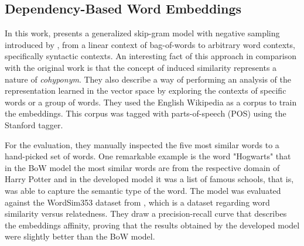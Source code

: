 \subsection{Dependency-Based Word Embeddings}

In this work,  presents a generalized skip-gram model with negative sampling introduced by , from a linear context of bag-of-words to arbitrary word contexts, specifically syntactic contexts. An interesting fact of this approach in comparison with the original work is that the concept of induced similarity represents a nature of \textit{cohyponym}. They also describe a way of performing an analysis of the representation learned in the vector space by exploring the contexts of specific words or a group of words.
They used the English Wikipedia as a corpus to train the embeddings. This corpus was tagged with parts-of-speech (POS) using the Stanford tagger. 

For the evaluation, they manually inspected the five most similar words to a hand-picked set of words. One remarkable example is the word "Hogwarts" that in the BoW model the most similar words are from the respective domain of Harry Potter and in the developed model it was a list of famous schools, that is, was able to capture the semantic type of the word.
The model was evaluated against the WordSim353 dataset from , which is a dataset regarding word similarity versus relatedness. They draw a precision-recall curve that describes the embeddings affinity, proving that the results obtained by the developed model were slightly better than the BoW model.

